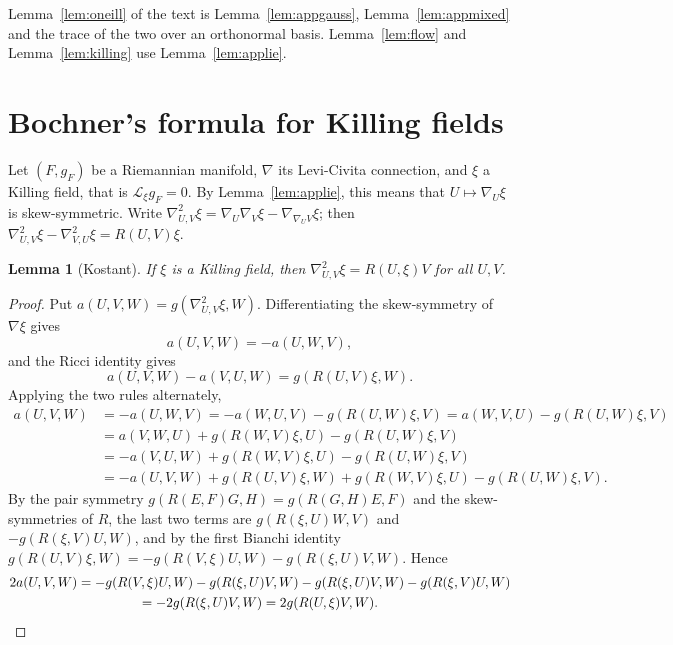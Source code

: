 \documentclass[11pt,reqno]{amsart}
\theoremstyle{plain}
\newtheorem{lemma}[theorem]{Lemma}
\theoremstyle{definition}
\newcommand{\lie}{\mathcal{L}}
\begin{document}
Lemma~\ref{lem:oneill} of the text is Lemma~\ref{lem:appgauss}, Lemma~\ref{lem:appmixed} and the trace of the two over an orthonormal basis. Lemma~\ref{lem:flow} and Lemma~\ref{lem:killing} use Lemma~\ref{lem:applie}.

\section{Bochner's formula for Killing fields}\label{app:bochner}

Let $(F,g_F)$ be a Riemannian manifold, $\nabla$ its Levi-Civita connection, and $\xi$ a Killing field, that is $\lie_\xi g_F=0$. By Lemma~\ref{lem:applie}, this means that $U\mapsto\nabla_U\xi$ is skew-symmetric. Write $\nabla^2_{U,V}\xi=\nabla_U\nabla_V\xi-\nabla_{\nabla_UV}\xi$; then $\nabla^2_{U,V}\xi-\nabla^2_{V,U}\xi=R(U,V)\xi$.

\begin{lemma}[Kostant]\label{lem:appkostant}
If $\xi$ is a Killing field, then $\nabla^2_{U,V}\xi=R(U,\xi)V$ for all $U,V$.
\end{lemma}

\begin{proof}
Put $a(U,V,W)=g(\nabla^2_{U,V}\xi,W)$. Differentiating the skew-symmetry of $\nabla\xi$ gives
\[
a(U,V,W)=-a(U,W,V),
\]
and the Ricci identity gives
\[
a(U,V,W)-a(V,U,W)=g(R(U,V)\xi,W).
\]
Applying the two rules alternately,
\begin{align*}
a(U,V,W)&=-a(U,W,V)=-a(W,U,V)-g(R(U,W)\xi,V)=a(W,V,U)-g(R(U,W)\xi,V)\\
&=a(V,W,U)+g(R(W,V)\xi,U)-g(R(U,W)\xi,V)\\
&=-a(V,U,W)+g(R(W,V)\xi,U)-g(R(U,W)\xi,V)\\
&=-a(U,V,W)+g(R(U,V)\xi,W)+g(R(W,V)\xi,U)-g(R(U,W)\xi,V).
\end{align*}
By the pair symmetry $g(R(E,F)G,H)=g(R(G,H)E,F)$ and the skew-symmetries of $R$, the last two terms are $g(R(\xi,U)W,V)$ and $-g(R(\xi,V)U,W)$, and by the first Bianchi identity $g(R(U,V)\xi,W)=-g(R(V,\xi)U,W)-g(R(\xi,U)V,W)$. Hence
\begin{multline*}
2a(U,V,W)=-g(R(V,\xi)U,W)-g(R(\xi,U)V,W)-g(R(\xi,U)V,W)-g(R(\xi,V)U,W)\\
=-2g(R(\xi,U)V,W)=2g(R(U,\xi)V,W).\qedhere
\end{multline*}
\end{proof}
\end{document}
